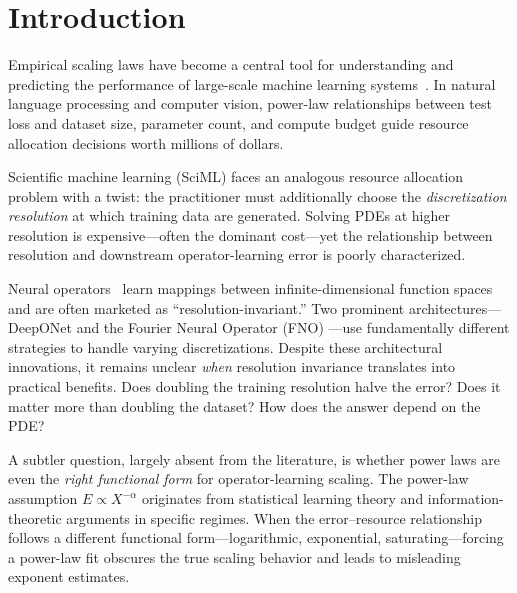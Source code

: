\documentclass[11pt]{article}
\begin{document}
\section{Introduction}
\label{sec:intro}

Empirical scaling laws have become a central tool for understanding and
predicting the performance of large-scale machine learning
systems~\citep{kaplan2020scaling,hoffmann2022training}. In natural
language processing and computer vision, power-law relationships between
test loss and dataset size, parameter count, and compute budget guide
resource allocation decisions worth millions of dollars.

Scientific machine learning (SciML) faces an analogous resource
allocation problem with a twist: the practitioner must additionally
choose the \emph{discretization resolution} at which training data are
generated. Solving PDEs at higher resolution is expensive---often the
dominant cost---yet the relationship between resolution and downstream
operator-learning error is poorly characterized.

Neural operators~\citep{lu2021learning,li2021fourier} learn mappings
between infinite-dimensional function spaces and are often marketed as
``resolution-invariant.'' Two prominent architectures---DeepONet
\citep{lu2021learning} and the Fourier Neural Operator (FNO)
\citep{li2021fourier}---use fundamentally different strategies to
handle varying discretizations. Despite these architectural innovations,
it remains unclear \emph{when} resolution invariance translates into
practical benefits. Does doubling the training resolution halve the
error? Does it matter more than doubling the dataset? How does the
answer depend on the PDE?

A subtler question, largely absent from the literature, is whether
power laws are even the \emph{right functional form} for operator-learning
scaling. The power-law assumption $E \propto X^{-\alpha}$ originates
from statistical learning theory and information-theoretic arguments
in specific regimes. When the error--resource relationship follows
a different functional form---logarithmic, exponential,
saturating---forcing a power-law fit obscures the true scaling behavior
and leads to misleading exponent estimates.
\end{document}

